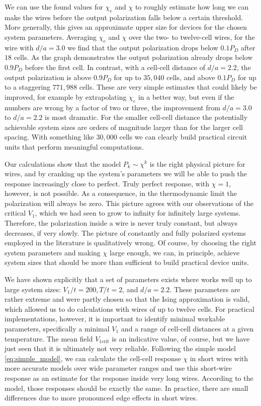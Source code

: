 We can use the found values for $\chi_e$ and $\chi$ to roughly estimate how long
we can make the wires before the output polarization falls below a certain
threshold. More generally, this gives an approximate upper size for 
devices for the chosen system parameters. Averaging $\chi_e$ and $\chi$ over the
two- to twelve-cell wires, for the wire with $d/a = 3.0$ we find that the output
polarization drops below $0.1 P_D$ after $18$ cells. As the graph demonstrates
the output polarization already drops below $0.9 P_D$ before the first cell. In
contrast, with a cell-cell distance of $d/a = 2.2$, the output polarization is
above $0.9 P_D$ for up to $35,040$ cells, and above $0.1 P_D$ for up to a
staggering $771,988$ cells. These are very simple estimates that could likely be
improved, for example by extrapolating $\chi_e$ in a better way, but even if the
numbers are wrong by a factor of two or three, the improvement from $d/a = 3.0$
to $d/a = 2.2$ is most dramatic. For the smaller cell-cell distance the
potentially achievable system sizes are orders of magnitude larger than for the
larger cell spacing. With something like $30,000$ cells we can clearly build
practical circuit units that perform meaningful computations.

Our calculations show that the model $P_k \sim \chi^k$ is the right physical
picture for  wires, and by cranking up the system's parameters we will
be able to push the response increasingly close to perfect. Truly perfect
response, with $\chi = 1$, however, is not possible. As a consequence, in the
thermodynamic limit the polarization will always be zero. This picture agrees
with our observations of the critical $V_1$, which we had seen to grow to
infinity for infinitely large systems. Therefore, the polarization inside a wire
is never truly constant, but always decreases, if very slowly. The picture of
constantly and fully polarized  systems employed in the literature is
qualitatively wrong. Of course, by choosing the right system parameters and
making $\chi$ large enough, we can, in principle, achieve system sizes that
should be more than sufficient to build practical device units. 

We have shown explicitly that a set of parameters exists where  works
well up to large system sizes: $V_1/t = 200, T/t = 2$, and $d/a = 2.2$. These
parameters are rather extreme and were partly chosen so that the Ising
approximation is valid, which allowed us to do calculations with wires of up to
twelve cells. For practical  implementations, however, it is important
to identify minimal workable parameters, specifically a minimal $V_1$ and a
range of cell-cell distances at a given temperature. The mean field
$V_{1\textrm{crit}}$ is an indicative value, of course, but we have just seen
that it is ultimately not very reliable. Following the simple model
\eqref{eq:simple_model}, we can calculate the cell-cell response $\chi$ in short
wires with more accurate models over wide parameter ranges and use this
short-wire response as an estimate for the response inside very long wires.
According to the model, those responses should be exactly the same. In practice,
there are small differences due to more pronounced edge effects in short wires.

